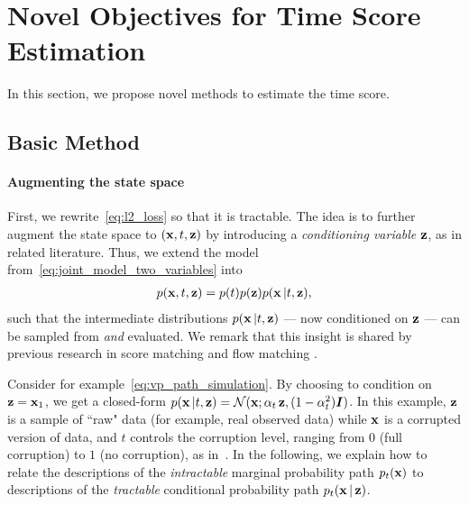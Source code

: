 

\section{Novel Objectives for Time Score Estimation}
\label{sec:estimating_time_score}

In this section, we propose novel methods to estimate the time score.

\subsection{Basic Method}

\paragraph{Augmenting the state space}
First,  we rewrite~\eqref{eq:l2_loss} so that it is tractable. The idea is to further augment the state space to $(\operatorname{\mathbf{x}}, t, \operatorname{\mathbf{z}})$ by introducing a \textit{conditioning variable} $\operatorname{\mathbf{z}}$, as in related literature. Thus, we extend the model from~\eqref{eq:joint_model_two_variables} into 
\begin{align}
    \label{eq:joint_model_three_variables}
    p(\operatorname{\mathbf{x}}, t, \operatorname{\mathbf{z}}) = p(t) p(\operatorname{\mathbf{z}}) p(\operatorname{\mathbf{x}} | t, \operatorname{\mathbf{z}}),
\end{align}
such that the intermediate distributions $p(\operatorname{\mathbf{x}} | t, \operatorname{\mathbf{z}})$ --- now conditioned on $\operatorname{\mathbf{z}}$ --- can be sampled from \textit{and} evaluated. We remark that this insight is shared by previous research in score matching \citet{vincent2011denoisingscorematching} and flow matching \citep{lipman2023conditionalflowmatching,pooladian2023conditionalflowmatching,tong2024conditionalflowmatching}.

Consider for example~\eqref{eq:vp_path_simulation}. By choosing to condition on $\operatorname{\mathbf{z}} = \operatorname{\mathbf{x}}_1$, we get a closed-form $p(\operatorname{\mathbf{x}} | t, \operatorname{\mathbf{z}}) = \mathcal{N}(\operatorname{\mathbf{x}}; \alpha_t \operatorname{\mathbf{z}}, (1-\alpha_t^2) {\bm{I}})$. In this example, $\operatorname{\mathbf{z}}$ is a sample of ``raw" data (for example, real observed data) while $\operatorname{\mathbf{x}}$ is a corrupted version of data, and $t$ controls the corruption level, ranging from $0$ (full corruption) to $1$ (no corruption), as in~\citet{vincent2011denoisingscorematching}. In the following, we explain how to relate the descriptions of the \textit{intractable} marginal probability path $p_t(\operatorname{\mathbf{x}})$ to descriptions of the \textit{tractable} conditional probability path $p_t(\operatorname{\mathbf{x}} | \operatorname{\mathbf{z}})$.


